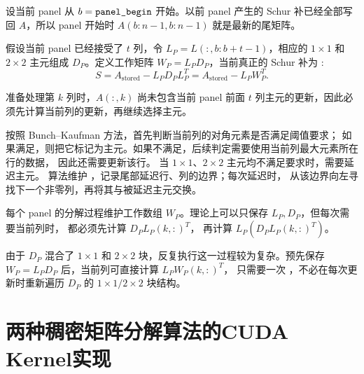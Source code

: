 设当前 panel 从
$b=\texttt{panel\_begin}$
开始。以前 panel 产生的 Schur 补已经全部写回 $A$，所以 panel 开始时
$A(b:n-1,b:n-1)$
就是最新的尾矩阵。

假设当前 panel 已经接受了 $t$ 列，令
$L_P=L(:,b:b+t-1)$，相应的 $1\times1$ 和 $2\times2$ 主元组成 $D_P$。定义工作矩阵
$W_P=L_PD_P$，当前真正的 Schur 补为 :
$$S=A_{\mathrm{stored}}-L_PD_PL_P^T
=A_{\mathrm{stored}}-L_PW_P^T.$$

准备处理第 $k$ 列时，$A(:,k)$ 尚未包含当前 panel 前面 $t$ 列主元的更新，因此必须先计算当前列的更新，再继续选择主元。

按照 Bunch--Kaufman 方法，首先判断当前列的对角元素是否满足阈值要求；
如果满足，则把它标记为主元。如果不满足，后续判定需要使用当前列最大元素所在行的数据，
因此还需要更新该行。
当 $1\times1$、$2\times2$ 主元均不满足要求时，需要延迟主元。
算法维护 ，记录尾部延迟行、列的边界；每次延迟时，
从该边界向左寻找下一个非零列，再将其与被延迟主元交换。

每个 panel 的分解过程维护工作数组 $W_P$。理论上可以只保存 $L_P,D_P$，但每次需要当前列时，
都必须先计算
$D_PL_P(k,:)^T$，
再计算
$L_P\left(D_PL_P(k,:)^T\right)$。

由于 $D_P$ 混合了 $1\times1$ 和 $2\times2$ 块，反复执行这一过程较为复杂。预先保存
$W_P=L_PD_P$
后，当前列可直接计算
$L_PW_P(k,:)^T$，
只需要一次 ，不必在每次更新时重新遍历 $D_P$ 的 $1\times1/2\times2$ 块结构。
\section{两种稠密矩阵分解算法的CUDA Kernel实现}